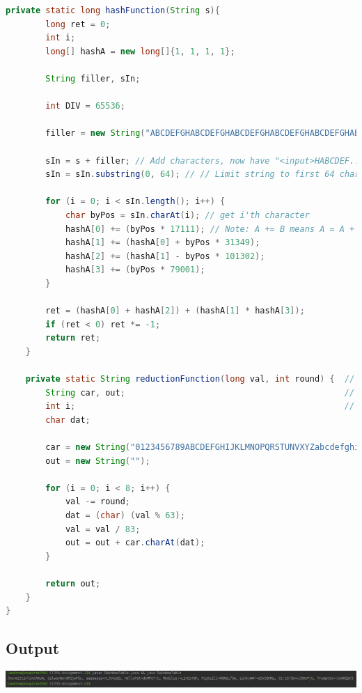 \documentclass[a4paper]{article}
\begin{document}
\begin{lstlisting}[language=Java]
    private static long hashFunction(String s){
        long ret = 0;
        int i;
        long[] hashA = new long[]{1, 1, 1, 1};
        
        String filler, sIn;
        
        int DIV = 65536;
        
        filler = new String("ABCDEFGHABCDEFGHABCDEFGHABCDEFGHABCDEFGHABCDEFGHABCDEFGHABCDEFGH");
        
        sIn = s + filler; // Add characters, now have "<input>HABCDEF..."
        sIn = sIn.substring(0, 64); // // Limit string to first 64 characters

        for (i = 0; i < sIn.length(); i++) {
            char byPos = sIn.charAt(i); // get i'th character
            hashA[0] += (byPos * 17111); // Note: A += B means A = A + B
            hashA[1] += (hashA[0] + byPos * 31349);
            hashA[2] += (hashA[1] - byPos * 101302);
            hashA[3] += (byPos * 79001);
        } 
           
        ret = (hashA[0] + hashA[2]) + (hashA[1] * hashA[3]);
        if (ret < 0) ret *= -1;
        return ret;
    } 
    
    private static String reductionFunction(long val, int round) {  // Note that for the first function call "round" has to be 0, 
        String car, out;                                            // and has to be incremented by one with every subsequent call. 
        int i;                                                      // I.e. "round" created variations of the reduction function.
        char dat;                                                  
        
        car = new String("0123456789ABCDEFGHIJKLMNOPQRSTUNVXYZabcdefghijklmnopqrstuvwxyz!#");
        out = new String("");
      
        for (i = 0; i < 8; i++) {
            val -= round;
            dat = (char) (val % 63);
            val = val / 83;
            out = out + car.charAt(dat);
        }
        
        return out;
    }
}
\end{lstlisting}

\subsection{Output}
\includegraphics[width = 16cm]{image.png}
\end{document}
